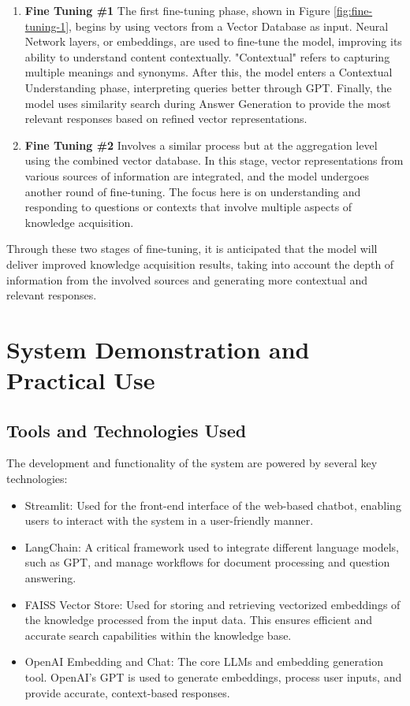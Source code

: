 \documentclass[runningheads]{llncs}
\begin{document}
\begin{enumerate}
    \item \textbf{Fine Tuning \#1} The first fine-tuning phase, shown in Figure \ref{fig:fine-tuning-1}, begins by using vectors from a Vector Database as input. Neural Network layers, or embeddings, are used to fine-tune the model, improving its ability to understand content contextually. "Contextual" refers to capturing multiple meanings and synonyms. After this, the model enters a Contextual Understanding phase, interpreting queries better through GPT. Finally, the model uses similarity search during Answer Generation to provide the most relevant responses based on refined vector representations.
                    
    \item \textbf{Fine Tuning \#2} Involves a similar process but at the aggregation level using the combined vector database. In this stage, vector representations from various sources of information are integrated, and the model undergoes another round of fine-tuning. The focus here is on understanding and responding to questions or contexts that involve multiple aspects of knowledge acquisition.
\end{enumerate}

Through these two stages of fine-tuning, it is anticipated that the model will deliver improved knowledge acquisition results, taking into account the depth of information from the involved sources and generating more contextual and relevant responses.

\section{System Demonstration and Practical Use}
\subsection{Tools and Technologies Used}
The development and functionality of the system are powered by several key technologies:
\begin{itemize}
    \item Streamlit: Used for the front-end interface of the web-based chatbot, enabling users to interact with the system in a user-friendly manner.
    \item LangChain: A critical framework used to integrate different language models, such as GPT, and manage workflows for document processing and question answering.
    \item FAISS Vector Store: Used for storing and retrieving vectorized embeddings of the knowledge processed from the input data. This ensures efficient and accurate search capabilities within the knowledge base.
    \item OpenAI Embedding and Chat: The core LLMs and embedding generation tool. OpenAI's GPT is used to generate embeddings, process user inputs, and provide accurate, context-based responses.
\end{itemize}
\end{document}
